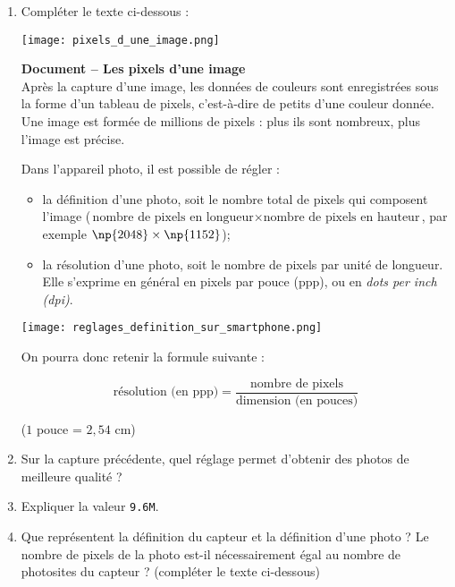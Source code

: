 \documentclass[a4paper]{article}
\newlength{\stextwidth} %
\newcommand{\guess}[1]{\ifthenelse{\boolean{reveal}}{{\color{red}#1}}{\settowidth{\stextwidth}{#1}\makebox[\stextwidth]{\dotfill}}}
\begin{document}
\begin{enumerate}
  \item Compléter le texte ci-dessous :
    \begin{multicols}{2}

      \begin{center}
	\texttt{[image: pixels\_d\_une\_image.png]}
      \end{center}

      \vspace*{12mm}

      \textbf{Document -- Les pixels d'une image}\\
      Après la capture d'une image, les données de couleurs sont enregistrées sous la forme d'un \og{}tableau de pixels\fg{}, c'est-à-dire de petits \guess{carrés} d'une couleur donnée. Une image est formée de millions de pixels : plus ils sont nombreux, plus l'image est précise.
    \end{multicols}

    \begin{multicols}{2}
      \vspace*{5mm}
    Dans l'appareil photo, il est possible de régler :
    \begin{itemize}
      \item la {\color{red}définition d'une photo}, soit le nombre total de pixels qui composent l'image ($\text{nombre de pixels en longueur}\times\text{nombre de pixels en hauteur}$, par exemple $\np{2048}\times\np{1152}$);
      \item la {\color{red}résolution d'une photo}, soit le nombre de pixels par unité de longueur. Elle s'exprime en général en {\color{blue}pixels par pouce (ppp)}, ou en {\color{blue}\textit{dots per inch (dpi)}}.
    \end{itemize}
    \vspace*{10mm}

    \begin{center}
      \texttt{[image: reglages\_definition\_sur\_smartphone.png]}
    \end{center}
    \end{multicols}

    On pourra donc retenir la formule suivante :

    \[\text{résolution (en ppp)} = \dfrac{\text{nombre de pixels}}{\text{dimension (en pouces)}}\]

    ($1$ pouce = $2,54$ cm)

  \item Sur la capture précédente, quel réglage permet d'obtenir des photos de meilleure qualité ?
  \item Expliquer la valeur \verb|9.6M|.
  \item Que représentent la définition du capteur et la définition d'une photo ? Le nombre de pixels de la photo est-il nécessairement égal au nombre de photosites du capteur ? (compléter le texte ci-dessous)


\end{enumerate}
\end{document}
